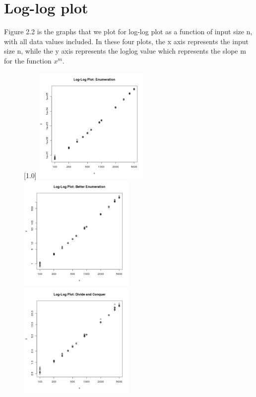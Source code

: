 \documentclass[11pt]{scrreprt}
\begin{document}
\section{Log-log plot}

Figure 2.2 is the graphs that we plot for log-log plot as a function of input size n, with all data values included. In these four plots, the x axis represents the input size n, while the y axis represents the loglog value which represents the slope m for the function $x^m$.

\begin{figure}[!htbp]
	\captionsetup{justification=centering,singlelinecheck=off}
	\captionsetup[subfigure]{singlelinecheck=on}
	[1.0\textwidth]{%
		\includegraphics[width=0.50\textwidth]{loglog_enumeration.png}%
		\includegraphics[width=0.50\textwidth]{loglog_better_enumeration.png}
		\includegraphics[width=0.50\textwidth]{loglog_divide_n_conquer.png}%
}
\end{figure}
\end{document}

